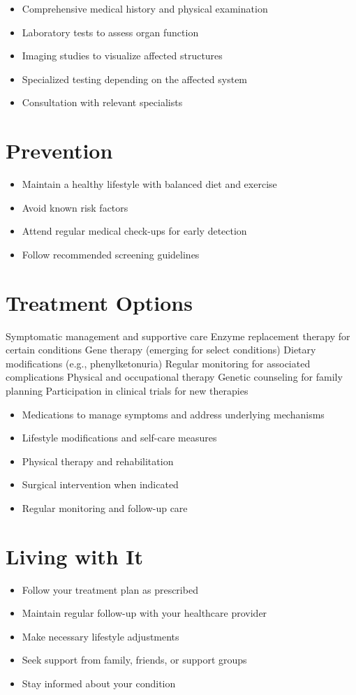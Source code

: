 \begin{itemize}[noitemsep]
  \item Comprehensive medical history and physical examination
  \item Laboratory tests to assess organ function
  \item Imaging studies to visualize affected structures
  \item Specialized testing depending on the affected system
  \item Consultation with relevant specialists
\end{itemize}
\section{Prevention}
\begin{itemize}[noitemsep]
  \item Maintain a healthy lifestyle with balanced diet and exercise
  \item Avoid known risk factors
  \item Attend regular medical check-ups for early detection
  \item Follow recommended screening guidelines
\end{itemize}
\section{Treatment Options}
Symptomatic management and supportive care Enzyme replacement therapy for certain conditions Gene therapy (emerging for select conditions) Dietary modifications (e.g., phenylketonuria) Regular monitoring for associated complications Physical and occupational therapy Genetic counseling for family planning Participation in clinical trials for new therapies

\begin{itemize}[noitemsep]
  \item Medications to manage symptoms and address underlying mechanisms
  \item Lifestyle modifications and self-care measures
  \item Physical therapy and rehabilitation
  \item Surgical intervention when indicated
  \item Regular monitoring and follow-up care
\end{itemize}
\section{Living with It}
\begin{itemize}[noitemsep]
  \item Follow your treatment plan as prescribed
  \item Maintain regular follow-up with your healthcare provider
  \item Make necessary lifestyle adjustments
  \item Seek support from family, friends, or support groups
  \item Stay informed about your condition
\end{itemize}

